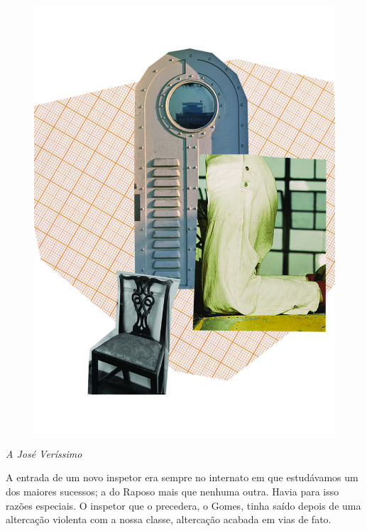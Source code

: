 \pagebreak
\thispagestyle{empty}
\begin{figure}
\includegraphics[width=\textwidth]{./ilustracoes/01_RAPOSO.jpg}

\end{figure}
\pagebreak


\begin{flushright}
\emph{A José Veríssimo}
\end{flushright}

\noindent{}A entrada de um novo inspetor era sempre no internato em que estudávamos
um dos maiores sucessos; a do Raposo mais que nenhuma outra. Havia para
isso razões especiais. O inspetor que o precedera, o Gomes, tinha saído
depois de uma altercação violenta com a nossa classe, altercação acabada
em vias de fato.

